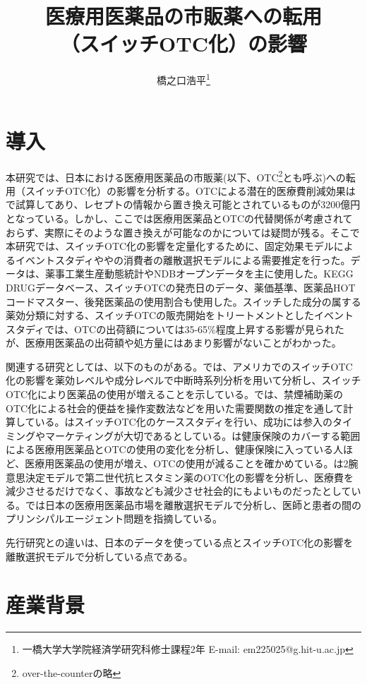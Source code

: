 \documentclass[a4paper,11pt,uplatex]{jsarticle}
\title{\vspace{-3cm}医療用医薬品の市販薬への転用\\（スイッチOTC化）の影響}
\author{橋之口浩平\thanks{一橋大学大学院経済学研究科修士課程2年 E-mail: em225025@g.hit-u.ac.jp}}
\date{}
\theoremstyle{definition}
\begin{document}
\maketitle{}
\section{導入}
本研究では、日本における医療用医薬品の市販薬(以下、OTC\footnote{over-the-counterの略}とも呼ぶ)への転用（スイッチOTC化）の影響を分析する。OTCによる潜在的医療費削減効果は\cite{igarashi2021}で試算してあり、レセプトの情報から置き換え可能とされているものが3200億円となっている。しかし、ここでは医療用医薬品とOTCの代替関係が考慮されておらず、実際にそのような置き換えが可能なのかについては疑問が残る。そこで本研究では、スイッチOTC化の影響を定量化するために、固定効果モデルによるイベントスタディや\cite{Berry1994}や\cite{BLP}の消費者の離散選択モデルによる需要推定を行った。データは、薬事工業生産動態統計やNDBオープンデータを主に使用した。KEGG DRUGデータベース、スイッチOTCの発売日のデータ、薬価基準、医薬品HOTコードマスター、後発医薬品の使用割合も使用した。スイッチした成分の属する薬効分類に対する、スイッチOTCの販売開始をトリートメントとしたイベントスタディでは、OTCの出荷額については35-65\%程度上昇する影響が見られたが、医療用医薬品の出荷額や処方量にはあまり影響がないことがわかった。


関連する研究としては、以下のものがある。\cite{Stomberg2013}では、アメリカでのスイッチOTC化の影響を薬効レベルや成分レベルで中断時系列分析を用いて分析し、スイッチOTC化により医薬品の使用が増えることを示している。\cite{Keeler2002}では、禁煙補助薬のOTC化による社会的便益を操作変数法などを用いた需要関数の推定を通して計算している。\cite{Mahecha2006}はスイッチOTC化のケーススタディを行い、成功には参入のタイミングやマーケティングが大切であるとしている。\cite{medicare1995}は健康保険のカバーする範囲による医療用医薬品とOTCの使用の変化を分析し、健康保険に入っている人ほど、医療用医薬品の使用が増え、OTCの使用が減ることを確かめている。\cite{medicare2003}は2腕意思決定モデルで第二世代抗ヒスタミン薬のOTC化の影響を分析し、医療費を減少させるだけでなく、事故なども減少させ社会的にもよいものだったとしている。\cite{Iizuka2007}では日本の医療用医薬品市場を離散選択モデルで分析し、医師と患者の間のプリンシパルエージェント問題を指摘している。

先行研究との違いは、日本のデータを使っている点とスイッチOTC化の影響を離散選択モデルで分析している点である。
\section{産業背景}
\end{document}
